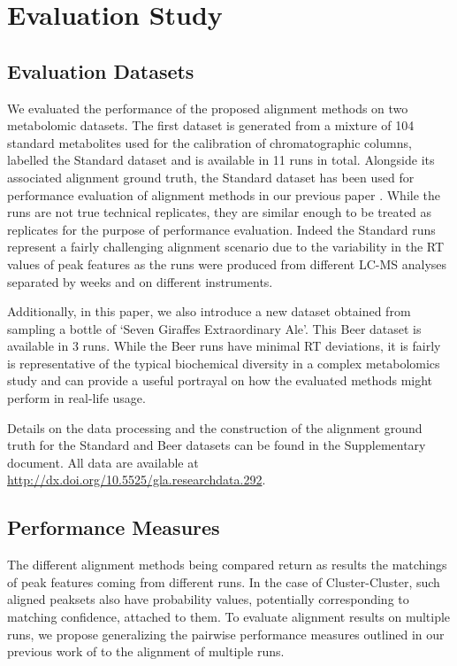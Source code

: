 \section{Evaluation Study}

\subsection{Evaluation Datasets}

We evaluated the performance of the proposed alignment methods on two metabolomic datasets. The first dataset is generated from a mixture of 104 standard metabolites used for the calibration of chromatographic columns, labelled the Standard dataset and is available in 11 runs in total. Alongside its associated alignment ground truth, the Standard dataset has been used for performance evaluation of alignment methods in our previous paper \cite{Wandy2015}. While the runs are not true technical replicates, they are similar enough to be treated as replicates for the purpose of performance evaluation. Indeed the Standard runs represent a fairly challenging alignment scenario due to the variability in the RT values of peak features as the runs were produced from different LC-MS analyses separated by weeks and on different instruments.

Additionally, in this paper, we also introduce a new dataset obtained from sampling a bottle of `Seven Giraffes Extraordinary Ale'. This Beer dataset is available in 3 runs. While the Beer runs have minimal RT deviations, it is fairly is representative of the typical biochemical diversity in a complex metabolomics study and can provide a useful portrayal on how the evaluated methods might perform in real-life usage.

Details on the data processing and the construction of the alignment ground truth for the Standard and Beer datasets can be found in the Supplementary document. All data are available at \href{http://dx.doi.org/10.5525/gla.researchdata.292
}{http://dx.doi.org/10.5525/gla.researchdata.292}.

\subsection{Performance Measures}

The different alignment methods being compared return as results the matchings of peak features coming from different runs. In the case of Cluster-Cluster, such aligned peaksets also have probability values, potentially corresponding to matching confidence, attached to them. To evaluate alignment results on multiple runs, we propose generalizing the pairwise performance measures outlined in our previous work of \cite{Wandy2015} to the alignment of multiple runs. 

